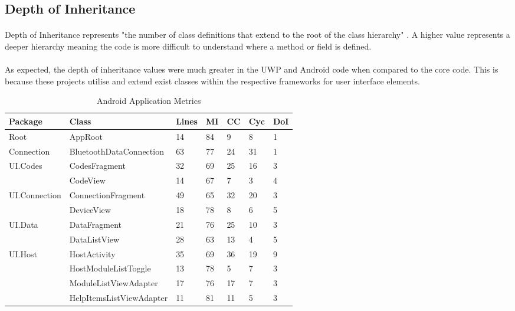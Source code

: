 {	\subsection*{Depth of Inheritance}{
		\paragraph{}{
		Depth of Inheritance represents "the number of class definitions that extend to the root of the class hierarchy" \cite{CodeMetrics}. A higher value represents a deeper hierarchy meaning the code is more difficult to understand where a method or field is defined.
		}
		\paragraph{}{
		As expected, the depth of inheritance values were much greater in the UWP and Android code when compared to the core code. This is because these projects utilise and extend exist classes within the respective frameworks for user interface elements.
		}
		
		\begin{table}[ht]
		\begin{scriptsize}			
			\begin{center}				
				\begin{tabularx}{\textwidth}{| l | X | l | l | l | l | l |}
								
				\hline
				\textbf{Package} & \textbf{Class} & \textbf{Lines} & \textbf{MI} & \textbf{CC} & \textbf{Cyc} & \textbf{DoI}\\
				\hline
				Root & AppRoot & 14 & 84 & 9 & 8 & 1\\
				\hline
				Connection & BluetoothDataConnection & 63 & 77 & 24 & 31 & 1\\
				\hline
				\multirow{2}{*}{UI.Codes} & CodesFragment & 32 & 69 & 25 & 16 & 3\\\cline{2-7}
										  & CodeView & 14 & 67 & 7 & 3 & 4\\\cline{2-7}
				\hline
				\multirow{2}{*}{UI.Connection} & ConnectionFragment & 49 & 65 & 32 & 20 & 3\\\cline{2-7}
										  	   & DeviceView & 18 & 78 & 8 & 6 & 5\\\cline{2-7}
				\hline
				\multirow{2}{*}{UI.Data} & DataFragment & 21 & 76 & 25 & 10 & 3\\\cline{2-7}
     							  	     & DataListView & 28 & 63 & 13 & 4 & 5\\\cline{2-7}
				\hline
				\multirow{4}{*}{UI.Host} & HostActivity & 35 & 69 & 36 & 19 & 9\\\cline{2-7}
										 & HostModuleListToggle & 13 & 78 & 5 & 7 & 3\\\cline{2-7}
										 & ModuleListViewAdapter & 17 & 76 & 17 & 7 & 3\\\cline{2-7}
										 & HelpItemsListViewAdapter & 11 & 81 & 11 & 5 & 3\\\cline{2-7}
				\hline
				\end{tabularx}
				\caption{Android Application Metrics}
				\label{tab:AndroidApp}
			\end{center}
		\end{scriptsize}
		\end{table}		
		
}}
